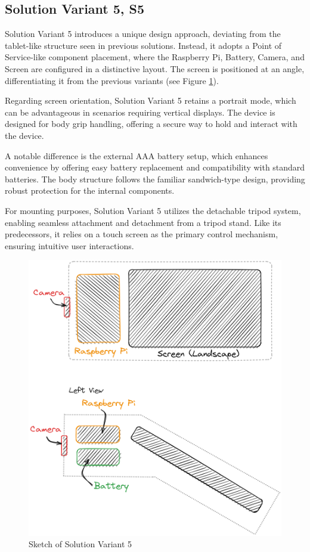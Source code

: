 \subsection{Solution Variant 5, S5}
Solution Variant 5 introduces a unique design approach, deviating from the tablet-like structure seen in previous solutions. Instead, it adopts a Point of Service-like component placement, where the Raspberry Pi, Battery, Camera, and Screen are configured in a distinctive layout. The screen is positioned at an angle, differentiating it from the previous variants (see Figure \ref{fig:sketch-solution-variant-5}).

Regarding screen orientation, Solution Variant 5 retains a portrait mode, which can be advantageous in scenarios requiring vertical displays. The device is designed for body grip handling, offering a secure way to hold and interact with the device.

A notable difference is the external AAA battery setup, which enhances convenience by offering easy battery replacement and compatibility with standard batteries. The body structure follows the familiar sandwich-type design, providing robust protection for the internal components.

For mounting purposes, Solution Variant 5 utilizes the detachable tripod system, enabling seamless attachment and detachment from a tripod stand. Like its predecessors, it relies on a touch screen as the primary control mechanism, ensuring intuitive user interactions.

\begin{figure}[H]
    \centering
    \includegraphics[width=0.5\linewidth]{texs/Part1/chapter3/image/v5.png}
    \caption{Sketch of Solution Variant 5}
    \label{fig:sketch-solution-variant-5}
\end{figure}

